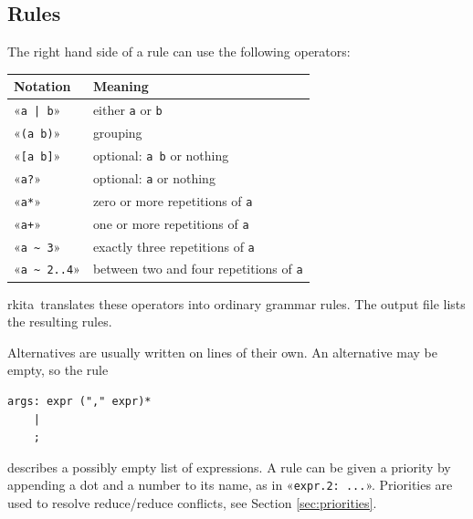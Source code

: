\documentclass[11pt,a4paper]{article}
\makeatletter
\newcommand{\blue}[1]{{\color{blue}#1}}
\newcommand{\fakesc}[1]{\resizebox{!}{0.99ex}{\textls[90]{\MakeUppercase{#1}}}}
\def\@simtextsc#1#2\@nil{\MakeUppercase{#1}\fakesc{#2}}
\newcommand{\simtextsc}[1]{%
  \ifmmode\text{\@simtextsc#1\@nil}\else\@simtextsc#1\@nil\fi}
\newcommand{\Larkita}{\simtextsc{Larkita}}
\newenvironment{unbreakable}{\par\noindent\begin{minipage}{\linewidth}}{\end{minipage}\par}
\makeatother
\begin{document}
\subsection{Rules}
The right hand side of a rule can use the following operators:
\begin{center}
\begin{tabular}{ll}
\toprule
\textbf{Notation}        & \textbf{Meaning} \\
\midrule
«\verb+a | b+»             & either \texttt{a} or \texttt{b} \\
«\verb|(a b)|»             & grouping \\
«\verb|[a b]|»             & optional: \texttt{a b} or nothing \\
«\verb|a?|»                & optional: \texttt{a} or nothing \\
«\verb|a*|»                & zero or more repetitions of \texttt{a} \\
«\verb|a+|»                & one or more repetitions of \texttt{a} \\
«\verb|a ~ 3|»             & exactly three repetitions of \texttt{a} \\
«\verb|a ~ 2..4|»          & between two and four repetitions of \texttt{a} \\
\bottomrule
\end{tabular}
\end{center}
\Larkita\ translates these operators into ordinary grammar rules.  The output file lists the resulting rules.

Alternatives are usually written on lines of their own.  An alternative may be empty, so the rule
\begin{unbreakable}
\begin{verbatim}
args: expr ("," expr)*
    |
    ;
\end{verbatim}
\end{unbreakable}
describes a possibly empty list of expressions.  A rule can be given a \blue{priority} by appending a dot and
a number to its name, as in «\verb|expr.2: ...|».  Priorities are used to resolve reduce/reduce conflicts, see
Section \ref{sec:priorities}.
\end{document}
